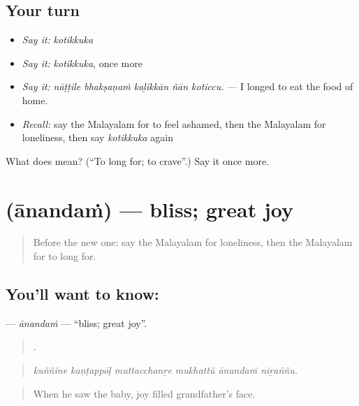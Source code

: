 \subsection*{Your turn}
\begin{itemize}
\raggedright
  \item \emph{Say it:} \emph{kotikkuka}
  \item \emph{Say it:} \emph{kotikkuka}, once more
  \item \emph{Say it:} \emph{nāṭṭile bhakṣaṇaṁ kaḻikkān ñān koticcu.} — I longed to eat the food of home.
  \item \emph{Recall:} say the Malayalam for to feel ashamed, then the Malayalam for loneliness, then say \emph{kotikkuka} again
\end{itemize}

\begin{tcolorbox}[breakable,colback=teal!4,colframe=teal!35!black,title={Before you move on}]
What does  mean? (\textquotedblleft{}To long for; to crave\textquotedblright{}.) Say it once more.
\end{tcolorbox}
\section[\texorpdfstring{\ml{ആനന്ദം} (ānandaṁ)}{ആനന്ദം (ānandaṁ)}]{ (ānandaṁ) — bliss; great joy}

\label{lesson:ML-C518-anandam}



\begin{quote}
Before the new one: say the Malayalam for loneliness, then the Malayalam for to long for.
\end{quote}

\subsection*{You'll want to know: }
\textbf{} — \emph{ānandaṁ} — \textquotedblleft{}bliss; great joy\textquotedblright{}.

\begin{quote}
     .
\end{quote}

\begin{quote}
\emph{kuññine kaṇṭappōḷ muttacchanṟe mukhattŭ ānandaṁ niṟaññu.}
\end{quote}

\begin{quote}
When he saw the baby, joy filled grandfather's face.
\end{quote}

